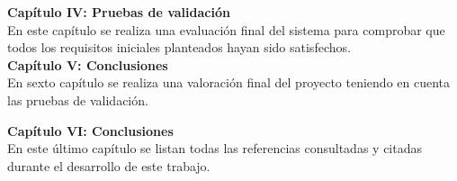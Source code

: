 \noindent \textbf{Capítulo IV: Pruebas de validación}\\
En este capítulo se realiza una evaluación final del sistema para comprobar que todos los requisitos iniciales planteados hayan sido satisfechos.\\

\noindent \textbf{Capítulo V: Conclusiones}\\
En sexto capítulo se realiza una valoración final del proyecto teniendo en cuenta las pruebas de validación.

\noindent \textbf{Capítulo VI: Conclusiones}\\
En este último capítulo se listan todas las referencias consultadas y citadas durante el desarrollo de este trabajo. 